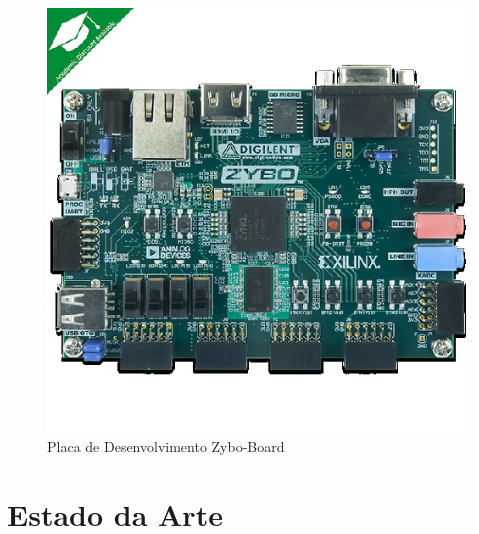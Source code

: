 \begin{figure}[h]
	\centering
	\includegraphics[keepaspectratio=true,scale=1.0]{figuras/zyboboard.eps}
	\caption{Placa de Desenvolvimento Zybo-Board}
	\label{Zybo Board}
\end{figure}



\section{Estado da Arte}
